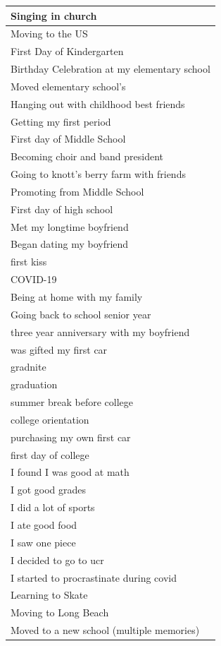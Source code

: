 \documentclass[
  .7em,
  letterpaper,
  DIV=11,
  numbers=noendperiod]{scrartcl}
\begin{document}
\begin{table}
\begin{tabular}{l}
\hline
Singing in church\\
\hline
Moving to the US\\
\hline
First Day of Kindergarten\\
\hline
Birthday Celebration at my elementary school\\
\hline
Moved elementary school's\\
\hline
Hanging out with childhood best friends\\
\hline
Getting my first period\\
\hline
First day of Middle School\\
\hline
Becoming choir and band president\\
\hline
Going to knott's berry farm with friends\\
\hline
Promoting from Middle School\\
\hline
First day of high school\\
\hline
Met my longtime boyfriend\\
\hline
Began dating my boyfriend\\
\hline
first kiss\\
\hline
COVID-19\\
\hline
Being at home with my family\\
\hline
Going back to school senior year\\
\hline
three year anniversary with my boyfriend\\
\hline
was gifted my first car\\
\hline
gradnite\\
\hline
graduation\\
\hline
summer break before college\\
\hline
college orientation\\
\hline
purchasing my own first car\\
\hline
first day of college\\
\hline
I found I was good at math\\
\hline
I got good grades\\
\hline
I did a lot of sports\\
\hline
I ate good food\\
\hline
I saw one piece\\
\hline
I decided to go to ucr\\
\hline
I started to procrastinate during covid\\
\hline
Learning to Skate\\
\hline
Moving to Long Beach\\
\hline
Moved to a new school (multiple memories)\\

\end{tabular}
\end{table}
\end{document}
